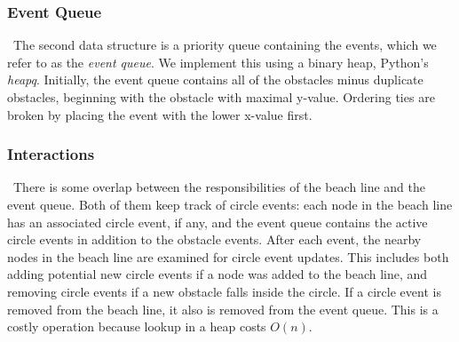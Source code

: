 \documentclass[conference]{IEEEtran}
\begin{document}
\subsubsection{Event Queue}
\noindent\ The second data structure is a priority queue containing the events, which we refer to as
the \emph{event queue}. We implement this using a binary heap, Python's \emph{heapq}.
Initially, the event queue contains all of the obstacles minus duplicate obstacles,
beginning with the obstacle with maximal y-value. Ordering ties are broken by
placing the event with the lower x-value first.

\subsubsection{Interactions}
\noindent\ There is some overlap between the responsibilities of the beach line and the event
queue. Both of them keep track of circle events: each node in the beach line
has an associated circle event, if any, and the event queue contains the
active circle events in addition to the obstacle events. After each event,
the nearby nodes in the beach line are examined for circle event updates. This
includes both adding potential new circle events if a node was added to the
beach line, and removing circle events if a new obstacle falls inside the
circle. If a circle event is removed from the beach line, it also is removed
from the event queue. This is a costly operation because lookup in a heap
costs $O(n)$.
\end{document}
